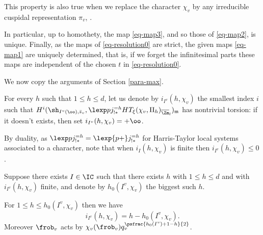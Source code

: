 \begin{remark}
This property is also true when we replace the character $\chi_v$ by
any irreducible cuspidal representation $\pi_v$, \cf \cite{boyer-duke}.
\end{remark}

\begin{fact}
In particular, up to homothety, the map \eqref{eq-map3}, and so those of \eqref{eq-map2}, is
unique. Finally, as the maps of \eqref{eq-resolution0} are strict, the given maps \eqref{eq-map1}
are uniquely determined, that is, if we forget the infinitesimal parts these maps are independent
of the chosen $t$ in \eqref{eq-resolution0}.
\end{fact}

We now copy the arguments of Section \ref{para-max}.

\begin{nota} \label{nota-ih}
For every $h$ such that $1 \leq h \leq d$, let us denote by $i_{I^v}(h,\chi_v)$ the smallest index $i$
such that
$H^i(\sh_{I^{v}(\oo),\bar s_v},\lexp p j^{=h}_{!*} HT_\xi(\chi_{v},\Pi_h)_{\overline \Zm_l})_{\mathfrak m}$
has nontrivial torsion: if it doesn't exists, then set $i_{I^v}(h,\chi_v)=+\oo$.
\end{nota}

\begin{remark}
By duality, as
$\lexp p j_{!*}^{=h}=\lexp {p+} j^{=h}_{!*}$ for Harris-Taylor local systems
associated to a
character, note that when $i_I(h,\chi_v)$ is finite then $i_{I^v}(h,\chi_v) \leq 0$.
\end{remark}

\begin{nota} \label{nota-h0}
Suppose there exists $I \in \IC$ such that
there exists $h$ with $1 \leq h \leq d$ and with $i_{I^v}(h,\chi_v)$ finite, and denote by
$h_0(I^v,\chi_v)$
the biggest such $h$.
\end{nota}

\begin{lemma} \label{lem-torsion-min}
For $1 \leq h \leq h_0(I^v,\chi_v)$ then we have
\[
i_{I^v}(h,\chi_v)=h-h_0(I^v,\chi_v).
\]
Moreover $\frob_v$ acts by $\chi_v(\frob_v) q_v^{\psfrac{h_0(I^v)+1-h}{2}}$.
\end{lemma}

